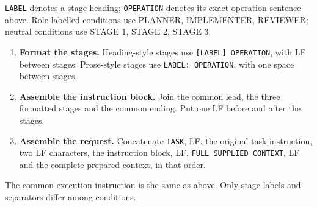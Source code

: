 \texttt{LABEL} denotes a stage heading; \texttt{OPERATION} denotes its exact operation sentence above. Role-labelled conditions use PLANNER, IMPLEMENTER, REVIEWER; neutral conditions use STAGE 1, STAGE 2, STAGE 3.
\begin{enumerate}
\item \textbf{Format the stages.} Heading-style stages use \texttt{[LABEL] OPERATION}, with LF between stages. Prose-style stages use \texttt{LABEL: OPERATION}, with one space between stages.
\item \textbf{Assemble the instruction block.} Join the common lead, the three formatted stages and the common ending. Put one LF before and after the stages.
\item \textbf{Assemble the request.} Concatenate \texttt{TASK}, LF, the original task instruction, two LF characters, the instruction block, LF, \texttt{FULL SUPPLIED CONTEXT}, LF and the complete prepared context, in that order.
\end{enumerate}
The common execution instruction is the same as above. Only stage labels and separators differ among conditions.
